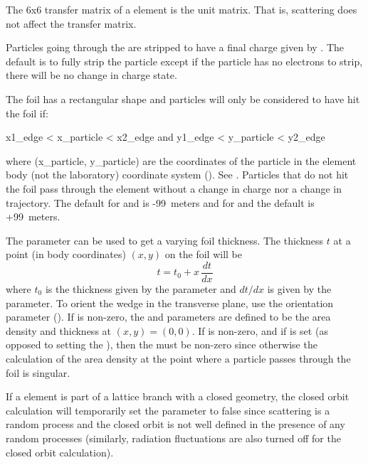 The 6x6 transfer matrix of a  element is the unit matrix. That is, scattering does
not affect the transfer matrix.

Particles going through the  are stripped to have a final charge given by
.  The default is to fully strip the particle except if the particle has no
electrons to strip, there will be no change in charge state.

The foil has a rectangular shape and particles will only be considered to have hit the foil if:
\begin{example}
  x1_edge < x_particle < x2_edge  and
  y1_edge < y_particle < y2_edge
\end{example}
where (x_particle, y_particle) are the coordinates of the particle in the element body (not the
laboratory) coordinate system (). See . Particles that do not hit the
foil pass through the element without a change in charge nor a change in trajectory. The default
for  and  is -99~meters and for  and  the default is
+99~meters.

The  parameter can be used to get a varying foil thickness. The thickness $t$ at
a point (in body coordinates) $(x,y)$ on the foil will be
\begin{equation}
  t = t_0 + x \, \frac{dt}{dx}
\end{equation}
where $t_0$ is the thickness given by the  parameter and $dt/dx$ is given by the
 parameter. To orient the wedge in the transverse plane, use the 
orientation parameter (). If  is non-zero, the
 and  parameters are defined to be the area density and thickness at
$(x,y) = (0,0)$. If  is non-zero, and if  is
set (as opposed to setting the ), then the  must be non-zero since otherwise
the calculation of the area density at the point where a particle passes through the foil is singular.

If a  element is part of a lattice branch with a closed geometry, the closed orbit
calculation will temporarily set the  parameter to false since scattering is a random
process and the closed orbit is not well defined in the presence of any random processes (similarly,
radiation fluctuations are also turned off for the closed orbit calculation).

\newpage

